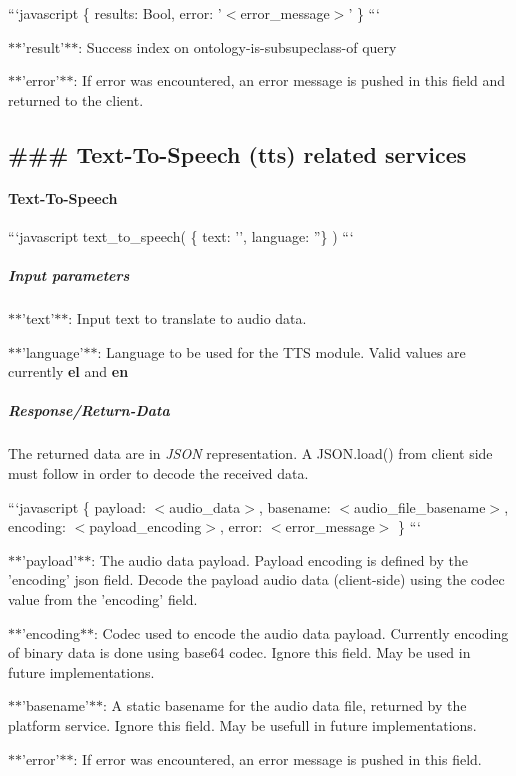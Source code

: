 ```javascript \{ results\-: Bool, error\-: '$<$error\-\_\-message$>$' \} ```


\begin{DoxyItemize}
\item $\ast$$\ast$'result'$\ast$$\ast$\-: Success index on ontology-\/is-\/subsupeclass-\/of query
\item $\ast$$\ast$'error'$\ast$$\ast$\-: If error was encountered, an error message is pushed in this field and returned to the client.
\end{DoxyItemize}

\subsection*{\#\#\# Text-\/\-To-\/\-Speech (tts) related services }

\paragraph*{Text-\/\-To-\/\-Speech}

```javascript text\-\_\-to\-\_\-speech( \{ text\-: '', language\-: ''\} ) ```

\subparagraph*{Input parameters}


\begin{DoxyItemize}
\item $\ast$$\ast$'text'$\ast$$\ast$\-: Input text to translate to audio data.
\item $\ast$$\ast$'language'$\ast$$\ast$\-: Language to be used for the T\-T\-S module. Valid values are currently {\bfseries el} and {\bfseries en}
\end{DoxyItemize}

\subparagraph*{Response/\-Return-\/\-Data}

The returned data are in {\itshape J\-S\-O\-N} representation. A J\-S\-O\-N.\-load() from client side must follow in order to decode the received data.

```javascript \{ payload\-: $<$audio\-\_\-data$>$, basename\-: $<$audio\-\_\-file\-\_\-basename$>$, encoding\-: $<$payload\-\_\-encoding$>$, error\-: $<$error\-\_\-message$>$ \} ```


\begin{DoxyItemize}
\item $\ast$$\ast$'payload'$\ast$$\ast$\-: The audio data payload. Payload encoding is defined by the 'encoding' json field. Decode the payload audio data (client-\/side) using the codec value from the 'encoding' field.
\item $\ast$$\ast$'encoding$\ast$$\ast$\-: Codec used to encode the audio data payload. Currently encoding of binary data is done using base64 codec. Ignore this field. May be used in future implementations.
\item $\ast$$\ast$'basename'$\ast$$\ast$\-: A static basename for the audio data file, returned by the platform service. Ignore this field. May be usefull in future implementations.
\item $\ast$$\ast$'error'$\ast$$\ast$\-: If error was encountered, an error message is pushed in this field.
\end{DoxyItemize}

